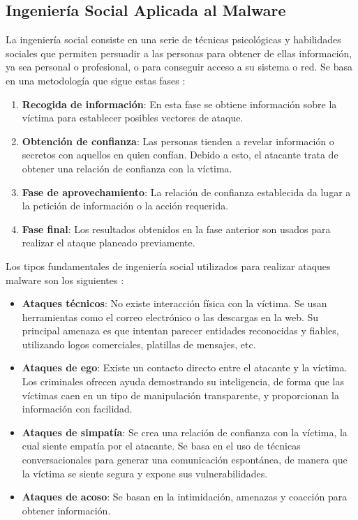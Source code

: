 \subsection{Ingeniería Social Aplicada al Malware}
\noindent La ingeniería social consiste en una serie de técnicas psicológicas y habilidades sociales que permiten persuadir a las personas para obtener de ellas información, ya sea personal o profesional, o para conseguir acceso a su sistema o red. Se basa en una metodología que sigue estas fases \cite{GallegosSegovia2017}:
\begin{enumerate}
    \item \textbf{Recogida de información}: En esta fase se obtiene información sobre la víctima para establecer posibles vectores de ataque.
    \item \textbf{Obtención de confianza}: Las personas tienden a revelar información o secretos con aquellos en quien confían. Debido a esto, el atacante trata de obtener una relación de confianza con la víctima.
    \item \textbf{Fase de aprovechamiento}: La relación de confianza establecida da lugar a la petición de información o la acción requerida. 
    \item \textbf{Fase final}: Los resultados obtenidos en la fase anterior son usados para realizar el ataque planeado previamente.
\end{enumerate}
Los tipos fundamentales de ingeniería social utilizados para realizar ataques malware son los siguientes \cite{GallegosSegovia2017}:
\begin{itemize}
    \item \textbf{Ataques técnicos}: No existe interacción física con la víctima. Se usan herramientas como el correo electrónico o las descargas en la web. Su principal amenaza es que intentan parecer entidades reconocidas y fiables, utilizando logos comerciales, platillas de mensajes, etc.
    \item \textbf{Ataques de ego}: Existe un contacto directo entre el atacante y la víctima.  Los criminales ofrecen ayuda demostrando su inteligencia, de forma que las víctimas caen en un tipo de manipulación transparente, y proporcionan la información con facilidad. 
    \item \textbf{Ataques de simpatía}: Se crea una relación de confianza con la víctima, la cual siente empatía por el atacante. Se basa en el uso de técnicas conversacionales para generar una comunicación espontánea, de manera que la víctima se siente segura y expone sus vulnerabilidades.
    \item \textbf{Ataques de acoso}: Se basan en la intimidación, amenazas y coacción para obtener información.
\end{itemize}

